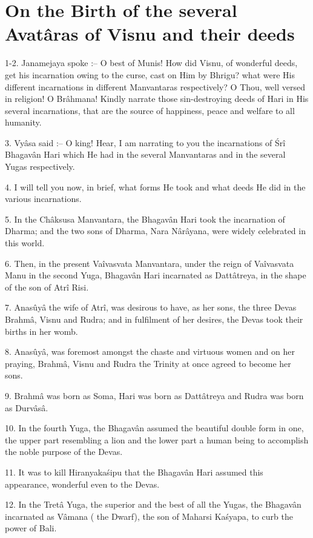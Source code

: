 ﻿\chapter{On the Birth of the several Avat\^aras of Visnu and their deeds}

1-2. Janamejaya spoke :-- O best of Munis! How did Visnu, of wonderful deeds, get his incarnation owing to the curse, cast on Him by Bhrigu? what were His different incarnations in different Manvantaras respectively? O Thou, well versed in religion! O Br\^ahmana! Kindly narrate those sin-destroying deeds of Hari in His several incarnations, that are the source of happiness, peace and welfare to all humanity.

3. Vy\^asa said :-- O king! Hear, I am narrating to you the incarnations of \'Sr\^i Bhagav\^an Hari which He had in the several Manvantaras and in the several Yugas respectively.

4. I will tell you now, in brief, what forms He took and what deeds He did in the various incarnations.

5. In the Ch\^aksusa Manvantara, the Bhagav\^an Hari took the incarnation of Dharma; and the two sons of Dharma, Nara N\^ar\^ayana, were widely celebrated in this world.

6. Then, in the present Va\^ivasvata Manvantara, under the reign of Va\^ivasvata Manu in the second Yuga, Bhagav\^an Hari incarnated as Datt\^atreya, in the shape of the son of Atr\^i Risi.

7. Anasûy\^a the wife of Atr\^i, was desirous to have, as her sons, the three Devas Brahm\^a, Visnu and Rudra; and in fulfilment of her desires, the Devas took their births in her womb.

8. Anasûy\^a, was foremost amongst the chaste and virtuous women and on her praying, Brahm\^a, Visnu and Rudra the Trinity at once agreed to become her sons.

9. Brahm\^a was born as Soma, Hari was born as Datt\^atreya and Rudra was born as Durv\^as\^a.

10. In the fourth Yuga, the Bhagav\^an assumed the beautiful double form in one, the upper part resembling a lion and the lower part a human being to accomplish the noble purpose of the Devas.

11. It was to kill Hiranyaka\'sipu that the Bhagav\^an Hari assumed this appearance, wonderful even to the Devas.

12. In the Tret\^a Yuga, the superior and the best of all the Yugas, the Bhagav\^an incarnated as V\^amana ( the Dwarf), the son of Maharsi Ka\'syapa, to curb the power of Bali.

